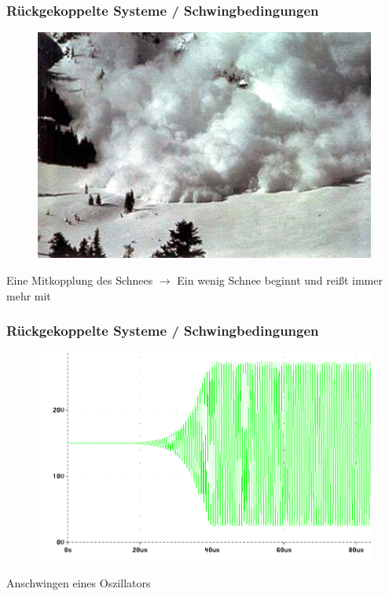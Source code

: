 \begin{frame}
  \frametitle{Rückgekoppelte Systeme / Schwingbedingungen}
  \begin{center}
    \begin{figure}
      \includegraphics[width=1\textwidth,height=.6\textheight,keepaspectratio]{a07/Lawine.jpg}
    \end{figure}
    Eine Mitkopplung des Schnees $\rightarrow$ Ein wenig Schnee beginnt und reißt immer mehr mit
  \end{center}
\end{frame}

\begin{frame}
  \frametitle{Rückgekoppelte Systeme / Schwingbedingungen}
  \begin{center}
    \begin{figure}
      \includegraphics[width=1\textwidth,height=.6\textheight,keepaspectratio]{a07/Oszillator_Anschwingen.png}
    \end{figure}
    Anschwingen eines Oszillators
  \end{center}
\end{frame}


